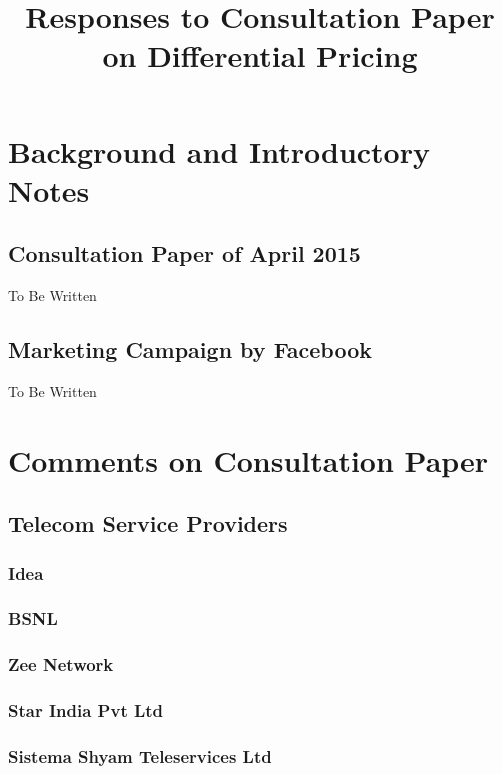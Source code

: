 \documentclass{article}
\title{Responses to Consultation Paper on Differential Pricing}
\begin{document}
\maketitle

\tableofcontents

\section{Background and Introductory Notes}
\subsection{Consultation Paper of April 2015}
To Be Written

\subsection{Marketing Campaign by Facebook}
To Be Written

\section{Comments on Consultation Paper}


\subsection{Telecom Service Providers}
\subsubsection{Idea}


\subsubsection{BSNL}


\subsubsection{Zee Network}


\subsubsection{Star India Pvt Ltd}


\subsubsection{Sistema Shyam Teleservices Ltd}

\end{document}
